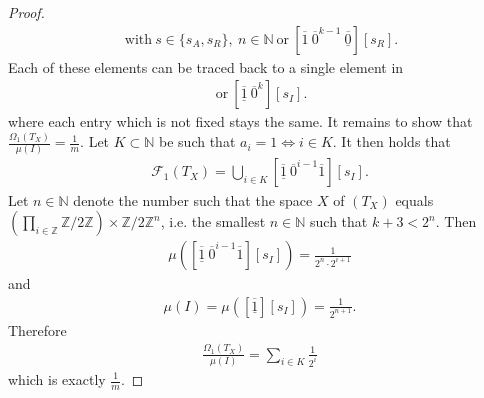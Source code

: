 \documentclass[12pt,a4paper]{scrartcl}
\numberwithin{equation}{section}
\newcommand{\Z}{\mathbb{Z}} %
\newcommand{\N}{\mathbb{N}} %
\newcommand{\2}{\mathbb{Z} / 2 \mathbb{Z}}
\newcommand{\1}{\overline{1}}
\newcommand{\0}{\overline{0}}
\begin{document}
\begin{proof}
	\begin{align*}
		[\1 \ \0^n \ \underline{\1}][s] \ \text{with} \ s \in \{s_A, s_R\}, \ n \in \N \ \text{or} \ [\1 \ \0^{k-1} \ \underline{\0}][s_R].
	\end{align*} 
	Each of these elements can be traced back to a single element in
	\begin{align*}
	[\underline{\1} \ \0^{n} \ \1][s_I] \ \text{or} \ [\underline{\1}  \ \0^{k}][s_I].
	\end{align*} 
	where each entry which is not fixed stays the same. 
	It remains to show that $\frac{\Omega_1(T_X)}{\mu(I)} = \frac{1}{m}$. Let $K \subset \N$ be such that $a_i = 1 \Leftrightarrow i \in K$. It then holds that
	\begin{align*}
		\mathcal{F}_1(T_X) = \bigcup_{i \in K}[\underline{\1} \ \0^{i-1} \1][s_I].
	\end{align*}
	Let $n \in \N$ denote the number such that the space $X$ of $(T_X)$ equals $(\prod_{i \in \Z} \2) \times \2^n$, i.e. the smallest $n \in \N$ such that $k+3 < 2^n$. Then 
	\begin{align*}
		\mu([\underline{\1} \ \0^{i-1} \1][s_I]) = \frac{1}{2^n \cdot 2^ {i + 1}}
	\end{align*}
	and
	\begin{align*}
		\mu(I) = \mu([\underline{\1}][s_I]) = \frac{1}{2^{n + 1}}.
	\end{align*}
	Therefore 
	\begin{align*}
		\frac{\Omega_1(T_X)}{\mu(I)} = \sum_{i \in K} \frac{1}{2^i}
	\end{align*}
	which is exactly $\frac{1}{m}$.
\end{proof}
\end{document}
